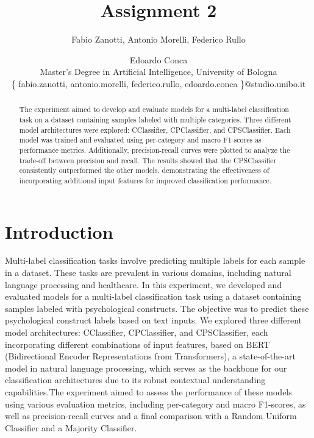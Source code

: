\documentclass[11pt]{article}
\begin{document}
%
\title{Assignment 2}
\author{Fabio Zanotti,
Antonio Morelli,
Federico Rullo
\and
Edoardo Conca\\
Master's Degree in Artificial Intelligence, University of Bologna\\
\{ fabio.zanotti, antonio.morelli, federico.rullo, edoardo.conca \}@studio.unibo.it
}
\maketitle

\begin{abstract}

The experiment aimed to develop and evaluate models for a multi-label classification task on a dataset containing samples labeled with multiple categories. Three different model architectures were explored: CClassifier, CPClassifier, and CPSClassifier. Each model was trained and evaluated using per-category and macro F1-scores as performance metrics. Additionally, precision-recall curves were plotted to analyze the trade-off between precision and recall. The results showed that the CPSClassifier consistently outperformed the other models, demonstrating the effectiveness of incorporating additional input features for improved classification performance.

\end{abstract}

\section{Introduction}
\label{sec:introduction}
Multi-label classification tasks involve predicting multiple labels for each sample in a dataset. These tasks are prevalent in various domains, including natural language processing and healthcare. In this experiment, we developed and evaluated models for a multi-label classification task using a dataset containing samples labeled with psychological constructs. The objective was to predict these psychological construct labels based on text inputs. We explored three different model architectures: CClassifier, CPClassifier, and CPSClassifier, each incorporating different combinations of input features, based on BERT (Bidirectional Encoder Representations from Transformers), a state-of-the-art model in natural language processing, which serves as the backbone for our classification architectures due to its robust contextual understanding capabilities.The experiment aimed to assess the performance of these models using various evaluation metrics, including per-category and macro F1-scores, as well as precision-recall curves and a final comparison with a Random Uniform Classifier and a Majority Classifier.
\end{document}
